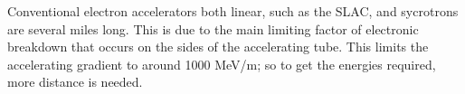 \documentclass[12pt]{article}
\author{Adam A. S. Green}
\begin{document}

\doublespacing
\noindent{}
Conventional electron accelerators both linear, such as the SLAC, and sycrotrons are several miles long. This is due to the main limiting factor of electronic breakdown that occurs on the sides of the accelerating tube. This limits the accelerating gradient to around 1000 MeV/m; so to get the energies required, more distance is needed.
\end{document}
